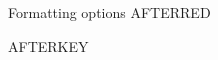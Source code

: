 \documentclass[aspectratio=169]{beamer}
\begin{document}
\begin{frame}{Formatting options}
\Huge
{} AFTERRED

 AFTERKEY

\end{frame}
\end{document}
